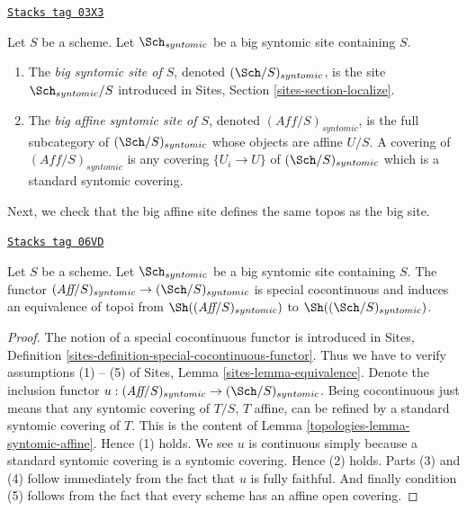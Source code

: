\begin{definition}
\label{topologies-definition-big-small-syntomic}
\href{https://stacks.math.columbia.edu/tag/03X3}{\texttt{Stacks tag 03X3}}

Let $S$ be a scheme. Let $\Sch_{syntomic}$ be a big syntomic
site containing $S$.
\begin{enumerate}
\item The {\it big syntomic site of $S$}, denoted
$(\Sch/S)_{syntomic}$, is the site $\Sch_{syntomic}/S$
introduced in Sites, Section \ref{sites-section-localize}.
\item The {\it big affine syntomic site of $S$}, denoted
$(\textit{Aff}/S)_{syntomic}$, is the full subcategory of
$(\Sch/S)_{syntomic}$ whose objects are affine $U/S$.
A covering of $(\textit{Aff}/S)_{syntomic}$ is any covering
$\{U_i \to U\}$ of $(\Sch/S)_{syntomic}$ which is a
standard syntomic covering.
\end{enumerate}
\end{definition}

Next, we check that the big affine site defines the same
topos as the big site.

\begin{lemma}
\label{topologies-lemma-affine-big-site-syntomic}
\href{https://stacks.math.columbia.edu/tag/06VD}{\texttt{Stacks tag 06VD}}

Let $S$ be a scheme. Let $\Sch_{syntomic}$ be a big syntomic
site containing $S$.
The functor
$(\textit{Aff}/S)_{syntomic} \to (\Sch/S)_{syntomic}$
is special cocontinuous and induces an equivalence of topoi from
$\Sh((\textit{Aff}/S)_{syntomic})$ to
$\Sh((\Sch/S)_{syntomic})$.
\end{lemma}

\begin{proof}

The notion of a special cocontinuous functor is introduced in
Sites, Definition \ref{sites-definition-special-cocontinuous-functor}.
Thus we have to verify assumptions (1) -- (5) of
Sites, Lemma \ref{sites-lemma-equivalence}.
Denote the inclusion functor
$u : (\textit{Aff}/S)_{syntomic} \to (\Sch/S)_{syntomic}$.
Being cocontinuous just means that any syntomic covering of
$T/S$, $T$ affine, can be refined by a standard syntomic covering of $T$.
This is the content of
Lemma \ref{topologies-lemma-syntomic-affine}.
Hence (1) holds. We see $u$ is continuous simply because a standard
syntomic covering is a syntomic covering. Hence (2) holds.
Parts (3) and (4) follow immediately from the fact that $u$ is
fully faithful. And finally condition (5) follows from the
fact that every scheme has an affine open covering.
\end{proof}

